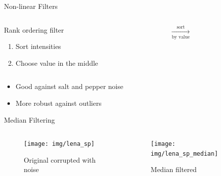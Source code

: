 \subtitle{Image Processing -- Non-linear Methods}
\frame[plain,c]{\titlepage}

\begin{frame}[t]{Non-linear Filters}
    \begin{columns}[T, onlytextwidth]
        \begin{column}{0.4\textwidth}
            {}

            Rank ordering filter\bigskip
            \begin{enumerate}
                \item Sort intensities
                \item Choose value in the middle
            \end{enumerate}
        \end{column}%
        \begin{column}{0.5\textwidth}
            \quad%
            $\xrightarrow[\text{by value}]{\text{sort}}$\quad%
            \quad%
        \end{column}
    \end{columns}
    \vspace{-4.5\bigskipamount}
    {}
    \begin{itemize}
        \item Good against salt and pepper noise
        \item More robust against outliers
    \end{itemize}
\end{frame}

\begin{frame}[c]{Median Filtering}
    \begin{columns}[c,onlytextwidth]
        \begin{column}{0.45\textwidth}\centering
            \begin{figure}[]
                \centering
                \texttt{[image: img/lena\_sp]}
                \caption{Original corrupted with noise}%
                \label{fig:name}
            \end{figure}
        \end{column}
        \begin{column}{0.45\textwidth}\centering
            \begin{figure}[]
                \centering
                \texttt{[image: img/lena\_sp\_median]}
                \caption{Median filtered}%
                \label{fig:name}
            \end{figure}
        \end{column}
    \end{columns}
\end{frame}

